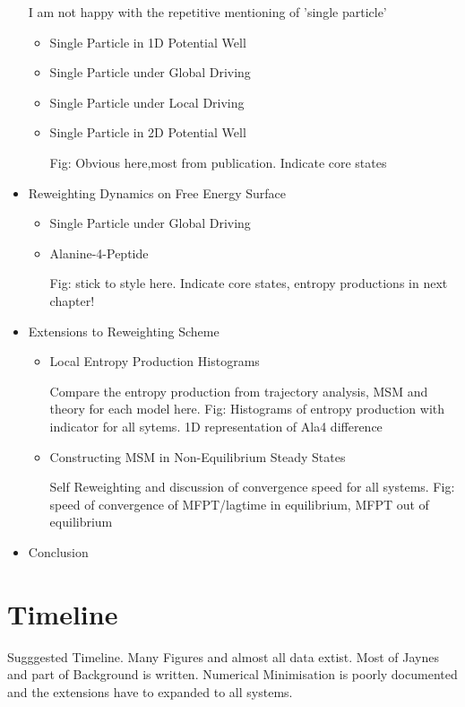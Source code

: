 \documentclass[a4paper,10pt]{article}
\begin{document}
\begin{itemize}
  I am not happy with the repetitive mentioning of 'single particle'
  \begin{itemize}
    \item Single Particle in 1D Potential Well
    \item Single Particle under Global Driving
    \item Single Particle under Local Driving
    \item Single Particle in 2D Potential Well 
    
    Fig: Obvious here,most from publication. Indicate core states
  \end{itemize}
  
  \item Reweighting Dynamics on Free Energy Surface
  \begin{itemize}
    \item Single Particle under Global Driving
    \item Alanine-4-Peptide
    
    Fig: stick to style here. Indicate core states, entropy productions in next chapter! 
    
  \end{itemize}
  
  \item Extensions to Reweighting Scheme 
  \begin {itemize}
  
    \item Local Entropy Production Histograms 

    Compare the entropy production from trajectory analysis, MSM and theory for each model here. 
    Fig: Histograms of entropy production with indicator for all sytems. 1D representation of Ala4 difference 
    
    
    \item Constructing MSM in Non-Equilibrium Steady States
    
    Self Reweighting and discussion of convergence speed for all systems. 
    Fig: speed of convergence of MFPT/lagtime in equilibrium, MFPT out of equilibrium
  \end{itemize}

  \item Conclusion
  
  \end{itemize}

  
\section{Timeline}
Sugggested Timeline. Many Figures and almost all data extist. Most of Jaynes and part of Background is written. Numerical Minimisation is poorly documented and the extensions have to expanded to all systems. \\
\end{document}
